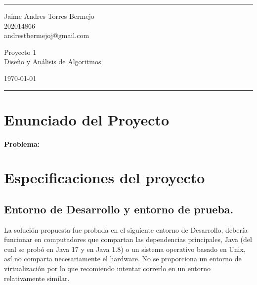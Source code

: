 \documentclass[a4paper]{article}
\begin{document}

\fancyhead[C]{}
\hrule \medskip %
\begin{minipage}{0.295\textwidth} 
\raggedright
\footnotesize
Jaime Andres Torres Bermejo \hfill\\   
202014866\hfill\\
andrestbermejoj@gmail.com
\end{minipage}
\begin{minipage}{0.4\textwidth} 
\centering 
\large 
Proyecto 1\\ 
\normalsize 
Diseño y Análisis de Algoritmos\\ 
\end{minipage}
\begin{minipage}{0.295\textwidth} 
\raggedleft
\today\hfill\\
\end{minipage}
\medskip\hrule 
\bigskip

\section{Enunciado del Proyecto}


\paragraph{Problema:}

\section{Especificaciones del proyecto}

\subsection{}

\subsection{Entorno de Desarrollo y entorno de prueba.}

La solución propuesta fue probada en el siguiente entorno de Desarrollo, debería funcionar en
computadores que compartan las dependencias principales, Java (del cual se probó en Java 17 y en Java 1.8) o un sistema operativo basado
en Unix, así no comparta necesariamente el hardware. No se proporciona un entorno de virtualización
por lo que recomiendo intentar correrlo en un entorno relativamente similar.
\end{document}
